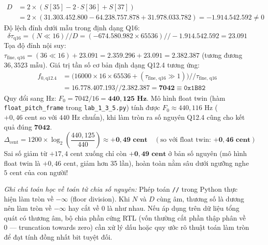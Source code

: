 \documentclass[11pt,a4paper]{article}
\begin{document}
\begin{itemize}
\begin{align}
    D &= 2 \times (S[35] - 2 \cdot S[36] + S[37]) \nonumber \\
      &= 2 \times (31.303.452.800 - 64.238.757.878 + 31.978.033.782) = -1.914.542.592 \ne 0
    \end{align}
    Độ lệch đỉnh dưới mẫu trong định dạng Q16:
    \begin{equation}
    \delta\tau_{\text{q16}} = (N \ll 16) // D = (-674.580.982 \times 65536) // -1.914.542.592 = \mathbf{23.091}
    \end{equation}
    Tọa độ đỉnh nội suy: $\tau_{\text{fine, q16}} = (36 \ll 16) + 23.091 = 2.359.296 + 23.091 = \mathbf{2.382.387}$ (tương đương $36{,}3523\text{ mẫu}$). Giá trị tần số cơ bản định dạng Q12.4 tương ứng:
    \begin{align}
    f_{0,\text{q12.4}} &= \big(16000 \times 16 \times 65536 + (\tau_{\text{fine, q16}} \gg 1)\big) // \tau_{\text{fine, q16}} \nonumber \\
    &= 16.778.407.193 // 2.382.387 = \mathbf{7042} \equiv \texttt{0x1B82}
    \end{align}
    Quy đổi sang Hz: $F_0 = 7042 / 16 = \mathbf{440{,}125\text{ Hz}}$. Mô hình float twin (hàm \texttt{float\_pitch\_frame} trong \texttt{lab\_1\_3\_5.py}) tính được $F_0 \approx 440{,}116\text{ Hz}$ ($+0{,}46\text{ cent}$ so với $440\text{ Hz}$ chuẩn), khi làm tròn ra số nguyên Q12.4 cũng cho kết quả đúng $\mathbf{7042}$.
    \begin{equation}
    \Delta_{\text{cent}} = 1200 \times \log_2\left(\frac{440{,}125}{440}\right) \approx \mathbf{+0{,}49\text{ cent}} \quad (\text{so với float twin: } \mathbf{+0{,}46\text{ cent}})
    \end{equation}
    Sai số giảm từ $+17{,}4\text{ cent}$ xuống chỉ còn $\mathbf{+0{,}49\text{ cent}}$ ở bản số nguyên (mô hình float twin là $+0{,}46\text{ cent}$, giảm hơn 35 lần), hoàn toàn nằm sâu dưới ngưỡng nghe $5\text{ cent}$ của con người!
    
    \textit{Ghi chú toán học về toán tử chia số nguyên:} Phép toán \texttt{//} trong Python thực hiện làm tròn về $-\infty$ (floor division). Khi $N$ và $D$ cùng âm, thương số là dương nên làm tròn về $-\infty$ hay cắt về $0$ là như nhau. Nếu áp dụng trên dữ liệu tổng quát có thương âm, bộ chia phần cứng RTL (vốn thường cắt phần thập phân về 0 --- truncation towards zero) cần xử lý dấu hoặc quy ước rõ thuật toán làm tròn để đạt tính đồng nhất bit tuyệt đối.
\end{itemize}
\end{document}
